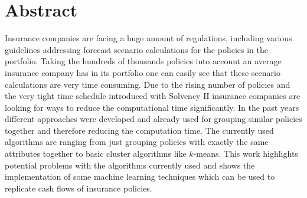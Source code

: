 

\chapter*{Abstract}
\label{cha:abstract}


Insurance companies are facing a huge amount of regulations, including various guidelines addressing forecast scenario calculations for the policies in the portfolio. Taking the hundreds of thousands policies into account an average insurance company has in its portfolio one can easily see that these scenario calculations are very time consuming. Due to the rising number of policies and the very tight time schedule introduced with Solvency II insurance companies are looking for ways to reduce the computational time significantly. In the past years different approaches were developed and already used for grouping similar policies together and therefore reducing the computation time. The currently used algorithms are ranging from just grouping policies with exactly the same attributes together to basic cluster algorithms like $k$-means. This work highlights potential problems with the algorithms currently used and shows the implementation of some machine learning techniques which can be used to replicate cash flows of insurance policies. 
